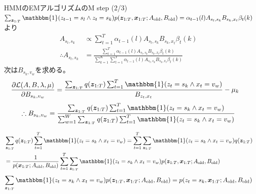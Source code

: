 \documentclass[aspectratio=169,unicode,dvipdfmx,14pt]{beamer}
\begin{document}
\begin{frame}{HMMのEMアルゴリズムのM step (2/3)}
\FontMath
$\sum_{\bm{z}_{1:T}}\mathbbm{1}( z_{t-1} = s_l \wedge z_t = s_k ) 
p(\bm{z}_{1:T} , \bm{x}_{1:T}; A_{\mbox{\scriptsize old}}, B_{\mbox{\scriptsize old}})
= \alpha_{t-1}(l) A_{s_l,s_k} B_{s_k,x_t} \beta_t(k)$より
\begin{align}
A_{s_l, s_k} & \propto \sum_{t=1}^T \alpha_{t-1}(l) A_{s_l,s_k} B_{s_k,x_t} \beta_t(k)
\\
\therefore A_{s_l, s_k} & = 
\frac{ \sum_{t=1}^T \alpha_{t-1}(l) A_{s_l,s_k} B_{s_k,x_t} \beta_t(k) }
{ \sum_{k=1}^K \sum_{t=1}^T \alpha_{t-1}(l) A_{s_l,s_k} B_{s_k,x_t} \beta_t(k) }
\end{align}
次は$B_{s_k,v_w}$を求める。
\begin{align}
\frac{\partial \mathcal{L}(A, B, \lambda, \mu) }{\partial B_{s_k, v_w}}
& = 
\frac{ \sum_{\bm{z}_{1:T}} q(\bm{z}_{1:T}) \sum_{t=1}^T 
\mathbbm{1}( z_t = s_k \wedge x_t = v_w ) }{ B_{z_t,x_t} }
- \mu_k
\end{align}
\begin{align}
\therefore B_{s_k, v_w} = \frac{
\sum_{\bm{z}_{1:T}} q(\bm{z}_{1:T}) \sum_{t=1}^T 
\mathbbm{1}( z_t = s_k \wedge x_t = v_w ) }{
\sum_{w=1}^W \sum_{\bm{z}_{1:T}} q(\bm{z}_{1:T}) \sum_{t=1}^T 
\mathbbm{1}( z_t = s_k \wedge x_t = v_w ) }
\end{align}
\end{frame}

\begin{frame}
\FontMath
\begin{align}
& \sum_{\bm{z}_{1:T}} q(\bm{z}_{1:T}) \sum_{t=1}^T 
\mathbbm{1}( z_t = s_k \wedge x_t = v_w )
= \sum_{t=1}^T \sum_{\bm{z}_{1:T}}   
\mathbbm{1}( z_t = s_k \wedge x_t = v_w ) q(\bm{z}_{1:T})
\notag \\ &
= 
\frac{1}{p(\bm{x}_{1:T}; A_{\mbox{\scriptsize old}}, B_{\mbox{\scriptsize old}})}
\sum_{t=1}^T \sum_{\bm{z}_{1:T}}  
\mathbbm{1}( z_t = s_k \wedge x_t = v_w )
p(\bm{z}_{1:T} , \bm{x}_{1:T}; A_{\mbox{\scriptsize old}}, B_{\mbox{\scriptsize old}})
\end{align}
\begin{align}
\sum_{\bm{z}_{1:T}}  
\mathbbm{1}( z_t = s_k \wedge x_t = v_w )
p(\bm{z}_{1:T} , \bm{x}_{1:T}; A_{\mbox{\scriptsize old}}, B_{\mbox{\scriptsize old}})
= p(z_t = s_k, \bm{x}_{1:T}; A_{\mbox{\scriptsize old}}, B_{\mbox{\scriptsize old}})
\end{align}
\end{frame}
\end{document}
